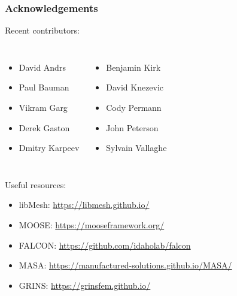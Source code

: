 \documentclass[mathserif]{beamer}
\begin{document}
\begin{frame}
\frametitle{Acknowledgements}

Recent contributors:
\begin{columns}


\begin{itemize}
\item David Andrs
\item Paul Bauman
\item Vikram Garg
\item Derek Gaston
\item Dmitry Karpeev 
\end{itemize}

\begin{itemize}
\item Benjamin Kirk
\item David Knezevic
\item Cody Permann
\item John Peterson 
\item Sylvain Vallaghe
\end{itemize}

\end{columns}

\vspace{5mm}

Useful resources:
\begin{itemize}
\item libMesh: \url{https://libmesh.github.io/}
\item MOOSE: \url{https://mooseframework.org/}
\item FALCON: \url{https://github.com/idaholab/falcon}
\item MASA: \url{https://manufactured-solutions.github.io/MASA/}
\item GRINS: \url{https://grinsfem.github.io/}
\end{itemize}

\begin{columns}[c] 
\begin{column}{.5\textwidth} 
\begin{block}{}
\end{block}
\end{column}
\end{columns}


\end{frame}

 
\end{document}
